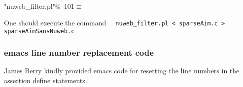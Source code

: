 \documentclass{article}
\begin{document}
\begin{flushleft} \small
\begin{minipage}{\linewidth}\label{scrap186}\raggedright\small
{} \verb@"nuweb_filter.pl"@\nobreak\ {\footnotesize {101}}$\equiv$
\vspace{-1ex}
\vspace{-1.5ex}
\footnotesize
\begin{list}{}{\setlength{\itemsep}{-\parsep}\setlength{\itemindent}{-\leftmargin}}

\item{}
\end{list}
\end{minipage}\vspace{4ex}
\end{flushleft}
One should execute the command
\verb+  nuweb_filter.pl < sparseAim.c > sparseAimSansNuweb.c+
\subsubsection{emacs line number replacement code}

James Berry kindly provided emacs code for resetting the line numbers
in the assertion define statements.
\end{document}
